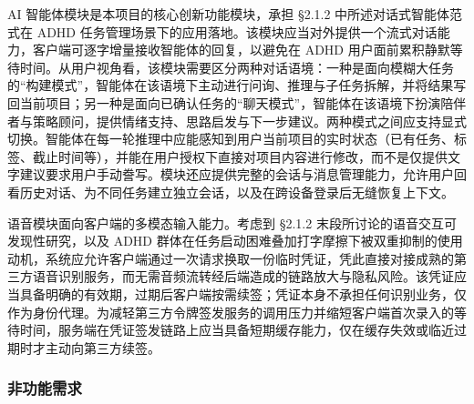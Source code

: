 \par AI 智能体模块是本项目的核心创新功能模块，承担 §2.1.2 中所述对话式智能体范式在 ADHD 任务管理场景下的应用落地。该模块应当对外提供一个流式对话能力，客户端可逐字增量接收智能体的回复，以避免在 ADHD 用户面前累积静默等待时间。从用户视角看，该模块需要区分两种对话语境：一种是面向模糊大任务的``构建模式''，智能体在该语境下主动进行问询、推理与子任务拆解，并将结果写回当前项目；另一种是面向已确认任务的``聊天模式''，智能体在该语境下扮演陪伴者与策略顾问，提供情绪支持、思路启发与下一步建议。两种模式之间应支持显式切换。智能体在每一轮推理中应能感知到用户当前项目的实时状态（已有任务、标签、截止时间等），并能在用户授权下直接对项目内容进行修改，而不是仅提供文字建议要求用户手动誊写。模块还应提供完整的会话与消息管理能力，允许用户回看历史对话、为不同任务建立独立会话，以及在跨设备登录后无缝恢复上下文。

\par 语音模块面向客户端的多模态输入能力。考虑到 §2.1.2 末段所讨论的语音交互可发现性研究，以及 ADHD 群体在任务启动困难叠加打字摩擦下被双重抑制的使用动机，系统应允许客户端通过一次请求换取一份临时凭证，凭此直接对接成熟的第三方语音识别服务，而无需音频流转经后端造成的链路放大与隐私风险。该凭证应当具备明确的有效期，过期后客户端按需续签；凭证本身不承担任何识别业务，仅作为身份代理。为减轻第三方令牌签发服务的调用压力并缩短客户端首次录入的等待时间，服务端在凭证签发链路上应当具备短期缓存能力，仅在缓存失效或临近过期时才主动向第三方续签。

\subsubsection{非功能需求}

